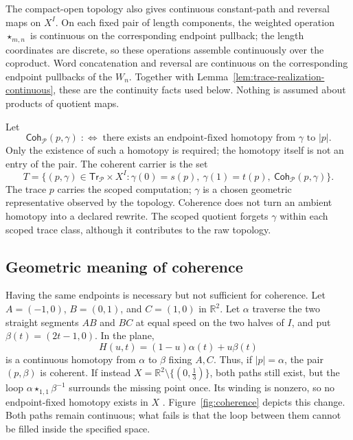 \documentclass[10pt,reqno]{amsart}
\theoremstyle{definition}
\theoremstyle{plain}
\theoremstyle{remark}
\newcommand{\FigureAltText}[1]{\par\smallskip{\small\textbf{Alt text:} #1\par}}
\newcommand{\MainFigure}[2]{%
  \begingroup\let\SavedFigureCaption\caption
  \renewcommand{\caption}[1]{\SavedFigureCaption{##1}\FigureAltText{#2}}%
  \endgroup}
\begin{document}
The compact-open topology also gives continuous constant-path and reversal
maps on $X^I$.  On each fixed pair of length components, the weighted
operation $\star_{m,n}$ is continuous on the corresponding endpoint
pullback; the length coordinates are discrete, so these operations assemble
continuously over the coproduct.  Word concatenation and reversal are
continuous on the corresponding endpoint pullbacks of the $W_n$.  Together
with Lemma~\ref{lem:trace-realization-continuous}, these are the continuity
facts used below.  Nothing is assumed about products of quotient maps.

Let
\[
  \mathsf{Coh}_{\mathcal P}(p,\gamma)\;:\Longleftrightarrow\;
  \text{there exists an endpoint-fixed homotopy from $\gamma$ to $|p|$}.
\]
Only the existence of such a homotopy is required; the homotopy itself is
not an entry of the pair.  The coherent carrier is the set
\[
  T=\{(p,\gamma)\in\mathsf{Tr}_{\mathcal P}\times X^I:
      \gamma(0)=s(p),\ \gamma(1)=t(p),\ \mathsf{Coh}_{\mathcal P}(p,\gamma)\}.
\]
The trace $p$ carries the scoped computation; $\gamma$ is a chosen geometric
representative observed by the topology. Coherence does not turn an ambient
homotopy into a declared rewrite. The scoped quotient forgets $\gamma$ within
each scoped trace class, although it contributes to the raw topology.

\subsection*{Geometric meaning of coherence}
Having the same endpoints is necessary but not sufficient for coherence.
Let $A=(-1,0)$, $B=(0,1)$, and $C=(1,0)$ in $\mathbb R^2$.
Let $\alpha$ traverse the two straight segments $AB$ and $BC$ at equal
speed on the two halves of $I$, and put $\beta(t)=(2t-1,0)$.
In the plane,
\[
 H(u,t)=(1-u)\alpha(t)+u\beta(t)
\]
is a continuous homotopy from $\alpha$ to $\beta$ fixing $A,C$.
Thus, if $|p|=\alpha$, the pair $(p,\beta)$ is coherent.
If instead $X=\mathbb R^2\setminus\{(0,\tfrac13)\}$, both paths still
exist, but the loop $\alpha\star_{1,1}\beta^{-1}$ surrounds the missing
point once.  Its winding is nonzero, so no endpoint-fixed homotopy exists
in $X$ \cite{Hatcher02}.  Figure~\ref{fig:coherence} depicts this change.
Both paths remain continuous; what fails is that the loop between them cannot
be filled inside the specified space.

\MainFigure{coherence}{A triangle contracts to its base segment in the plane; puncturing the triangle leaves a loop that cannot contract while avoiding the puncture.}
\end{document}
